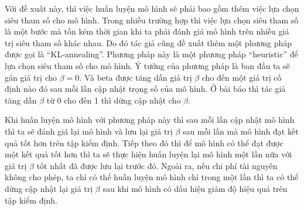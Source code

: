     Với đề xuất này, thì việc huấn luyện mô hình sẽ phải bao gồm thêm việc lựa chọn siêu tham số cho mô hình.
    Trong nhiều trường hợp thì việc lựa chọn siêu tham số là một bước mà tốn kém thời gian khi ta phải đánh giá mô hình trên nhiều giá trị siêu tham số khác nhau.  
    Do đó tác giả cũng đề xuất thêm một phương pháp được gọi là ``KL-annealing''.
    Phương pháp này là một phương pháp ``heuristic'' để lựa chọn siêu tham số cho mô hình.
    Ý tưởng của phương pháp là ban đầu ta sẽ gán giá trị cho $\beta =0$.
    Và beta được tăng dần giá trị $\beta$ cho đến một giá trị cố định nào đó sau mỗi lần cập nhật trọng số của mô hình.
    Ở bài báo \cite{mvae} thì tác giả tăng dần $\beta$ từ 0 cho đến 1 thì dừng cập nhật cho $\beta$.

    Khi huấn luyện mô hình với phương pháp này thì sau mỗi lần cập nhật mô hình thì ta sẽ đánh giá lại mô hình và lưu lại giá trị $\beta$ sau mỗi lần mà mô hình đạt kết quả tốt hơn trên tập kiểm định.
    Tiếp theo đó thì để mô hình có thể đạt được một kết quả tốt hơn thì ta sẽ thực hiện huấn luyện lại mô hình một lần nữa với giá trị $\beta$ tốt nhất đã được lưu lại trước đó.  Ngoài ra, nếu chi phí tài nguyên không cho phép, ta chỉ có thể huấn luyện mô hình chỉ trong một lần thì ta có thể dừng cập nhật lại giá trị $\beta$ sau khi mô hình có dấu hiệu giảm độ hiệu quả trên tập kiểm định. 

    
